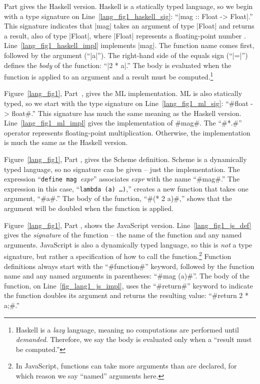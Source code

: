 \documentclass[12pt]{report}
\begin{document}
Part  gives the Haskell version. Haskell is
a statically typed language, so we begin with a type signature on
Line~\ref{lang_fig1_haskell_sig}: ``|mag :: Float -> Float|.'' This
signature indicates that |mag| takes an argument of type |Float| and
returns a result, also of type |Float|, where |Float| represents a
floating-point number
\citep{HaskellReportXX}. Line~\ref{lang_fig1_haskell_impl} implements
|mag|. The function name comes first, followed by the argument
(``|a|''). The right-hand side of the equals sign (``|=|'') defines
the \emph{body} of the function: ``|2 * a|.'' The body is evaluated
when the function is applied to an argument and a result must be
computed.\footnote{Haskell is a \emph{lazy} language, meaning no
  computations are performed until \emph{demanded}. Therefore, we say
  the body is evaluated only when a ``result must be computed.''}

Figure~\ref{lang_fig1}, Part~, gives the ML
implementation. ML is also statically typed, so we start with the type
signature on Line~\ref{lang_fig1_ml_sig}: ``#float -> float#.'' This
signature has much the same meaning as the Haskell
version. Line~\ref{lang_fig1_ml_impl} gives the implementation of
#mag#. The ``#*.#'' operator represents floating-point
multiplication. Otherwise, the implementation is much the same as the
Haskell version.

Figure~\ref{lang_fig1}, Part , gives the
Scheme definition. Scheme is a dynamically typed language, so no
signature can be given -- just the implementation. The expression
``\texttt{define mag}\ \emph{expr}'' associates \emph{expr} with the
name ``#mag#.'' The expression in this case, ``\texttt{lambda (a)
  \ldots)},'' creates a new function that takes one argument, ``#a#.''
The body of the function, ``#(* 2 a)#,'' shows that the argument will
be doubled when the function is applied.


Figure~\ref{lang_fig1}, Part , shows the
JavaScript version. Line~\ref{lang_fig1_js_def} gives the
\emph{signature} of the function -- the name of the function and any
named arguments. JavaScript is also a dynamically typed language, so
this is \emph{not} a type signature, but rather a specification of how
to call the function.\footnote{In JavaScript, functions can take more
  arguments than are declared, for which reason we say ``named''
  arguments here.}  Function definitions always start with the
``#function#'' keyword, followed by the function name and any
named arguments in parentheses: ``#mag (a)#''. The body of the function,
on Line~\ref{fig_lang1_js_impl}, uses the ``#return#'' keyword to
indicate the function doubles its argument and returns the resulting
value: ``#return 2 * a;#.''
\end{document}
